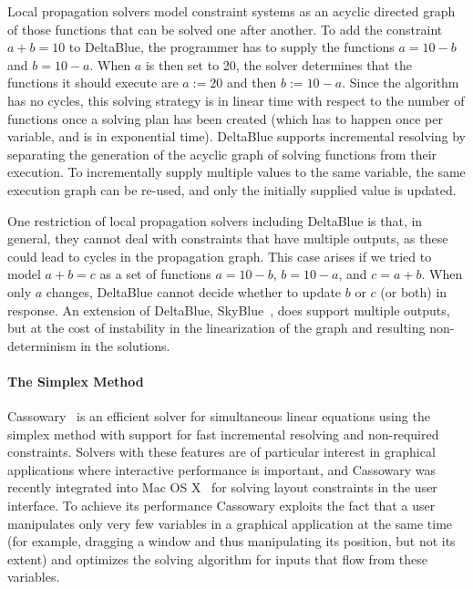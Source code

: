 Local propagation solvers model constraint systems as an acyclic directed graph
of those functions that can be solved one after another. To add the constraint
$a + b = 10$ to DeltaBlue, the programmer has to supply the functions
$a = 10 -b$ and $b = 10 - a$.  When $a$ is then set to 20, the solver determines
that the functions it should execute are $a := 20$ and then $b := 10 - a$. Since
the algorithm has no cycles, this solving strategy is in linear time with
respect to the number of functions once a solving plan has been created (which
has to happen once per variable, and is in exponential time). DeltaBlue supports
incremental resolving by separating the generation of the acyclic graph of
solving functions from their execution. To incrementally supply multiple values
to the same variable, the same execution graph can be re-used, and only the
initially supplied value is updated.

One restriction of local propagation solvers including DeltaBlue is that, in
general, they cannot deal with constraints that have multiple outputs, as these
could lead to cycles in the propagation graph. This case arises if we tried to
model $a + b = c$ as a set of functions $a = 10 - b$, $b = 10 - a$, and
$c = a + b$. When only $a$ changes, DeltaBlue cannot decide whether to update
$b$ or $c$ (or both) in response. An extension of DeltaBlue,
SkyBlue~\cite{sannella1993skyblue}, does support multiple outputs, but at the
cost of instability in the linearization of the graph and resulting
non-determinism in the solutions.

\paragraph{The Simplex Method}
\label{sec:cassowary}
Cassowary~\cite{badros2001cassowary} is an efficient solver for
simultaneous linear equations using the simplex method with support
for fast incremental resolving and non-required constraints. Solvers
with these features are of particular interest in graphical
applications where interactive performance is important, and Cassowary
was recently integrated into Mac OS X~\cite{AppleCocoaAutoLayout} for
solving layout constraints in the user interface. To achieve its
performance Cassowary exploits the fact that a user manipulates only
very few variables in a graphical application at the same time (for
example, dragging a window and thus manipulating its position, but not
its extent) and optimizes the solving algorithm for inputs that flow
from these variables.

